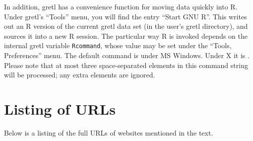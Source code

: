 In addition, gretl has a convenience function for moving data
quickly into R.  Under gretl's ``Tools'' menu, you will find the
entry ``Start GNU R''.  This writes out an R version of the current
gretl data set (in the user's gretl directory), and sources it
into a new R session.  The particular way R is invoked depends on the
internal gretl variable \verb+Rcommand+, whose value may be set
under the ``Tools, Preferences'' menu.  The default command is
 under MS Windows. Under X it is .
Please note that at most three space-separated elements in this
command string will be processed; any extra elements are ignored.

\chapter{Listing of URLs}
\label{app-urls}

Below is a listing of the full URLs of websites mentioned in the text.

